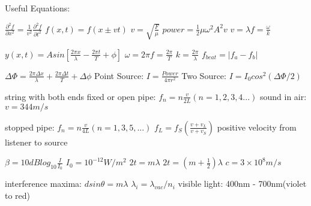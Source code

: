 \documentclass{exam}
\begin{document}
Useful Equations:
\vspace{5mm}

$\frac{\partial^2f}{\partial x^2}=\frac{1}{v^2}\frac{\partial^2f}{\partial t^2}$ 
$f(x,t) = f(x \pm vt)$
$v=\sqrt{\frac{F}{\mu}}$
$power = \frac{1}{2} \mu \omega^2 A^2 v$
$v = \lambda f = \frac{\omega}{k}$

$y(x,t) = A sin\left[\frac{2\pi x}{\lambda}-\frac{2\pi t}{T}+\phi\right]$
$\omega = 2\pi f = \frac{2\pi}{T}$
$k=\frac{2\pi}{\lambda}$
$f_{beat}=|f_a-f_b|$

$\Delta \Phi = \frac{2\pi \Delta x}{\lambda}+\frac{2\pi \Delta t}{T}+\Delta \phi$
Point Source: $I = \frac{Power}{4\pi r^2}$
Two Source: $I = I_0 cos^2(\Delta \Phi/2)$




string with both ends fixed or open pipe: $f_n=n\frac{v}{2L}(n=1,2,3,4...)$
sound in air: $v=344m/s$

stopped pipe: $f_n = n\frac{v}{4L} (n=1, 3, 5, ...)$
$f_L=f_S\left( \frac{v+v_L}{v+v_S}\right)$ positive velocity from listener to source

$\beta = 10dB log_{10}\frac{I}{I_0}$
\hspace{2mm}
$I_0=10^{-12}W/m^2$
$2t = m\lambda$
\hspace{4mm}
$2t = (m+\frac{1}{2})\lambda$
$c = 3\times10^8m/s$

interference maxima: $d sin\theta = m\lambda$
$\lambda_i = \lambda_{vac}/n_i$
visible light: 400nm - 700nm(violet to red)
\end{document}
